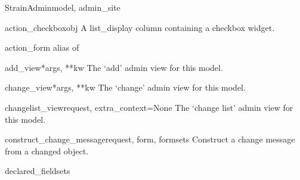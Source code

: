 \documentclass[letterpaper,10pt,english]{sphinxmanual}
\begin{document}
\hypertarget{animal.admin.StrainAdmin}{}\begin{classdesc}{StrainAdmin}{model, admin\_site}~

\hypertarget{animal.admin.StrainAdmin.action_checkbox}{}\begin{methoddesc}{action\_checkbox}{obj}
A list\_display column containing a checkbox widget.
\end{methoddesc}

\hypertarget{animal.admin.StrainAdmin.action_form}{}\begin{memberdesc}{action\_form}
alias of 
\end{memberdesc}

\hypertarget{animal.admin.StrainAdmin.add_view}{}\begin{methoddesc}{add\_view}{*args, **kw}
The `add' admin view for this model.
\end{methoddesc}

\hypertarget{animal.admin.StrainAdmin.change_view}{}\begin{methoddesc}{change\_view}{*args, **kw}
The `change' admin view for this model.
\end{methoddesc}

\hypertarget{animal.admin.StrainAdmin.changelist_view}{}\begin{methoddesc}{changelist\_view}{request, extra\_context=None}
The `change list' admin view for this model.
\end{methoddesc}

\hypertarget{animal.admin.StrainAdmin.construct_change_message}{}\begin{methoddesc}{construct\_change\_message}{request, form, formsets}
Construct a change message from a changed object.
\end{methoddesc}

\hypertarget{animal.admin.StrainAdmin.declared_fieldsets}{}\begin{memberdesc}{declared\_fieldsets}\end{memberdesc}


\end{classdesc}
\end{document}
